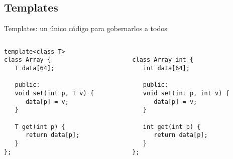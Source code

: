 \subsection{Templates}
\begin{frame}[fragile]{Templates: un \'unico c\'odigo para gobernarlos a todos}
   \begin{columns}[t]
      \begin{column}{.5\linewidth}
         \begin{lstlisting}[style=normal,linebackgroundcolor={%
         \only<1>{\def\lst@linebgrdcmd####1####2####3{}}%
         \btLstHLB<2>{1}% template keyword
         \btLstHLB<3>{3,6,10}% uso de T
   }]
template<class T>
class Array {
   T data[64];

   public:
   void set(int p, T v) {
      data[p] = v;
   }

   T get(int p) {
      return data[p];
   }
};
         \end{lstlisting}
      \end{column}
      \begin{column}{.42\linewidth}
         \begin{lstlisting}[style=normalnonumbers,linebackgroundcolor={%
         \only<1-2>{\def\lst@linebgrdcmd####1####2####3{}}%
         \btLstHLB<3>{3,6,10}% uso de T
   }]

class Array_int {
   int data[64];

   public:
   void set(int p, int v) {
      data[p] = v;
   }

   int get(int p) {
      return data[p];
   }
};
         \end{lstlisting}
      \end{column}
   \end{columns}
\end{frame}

